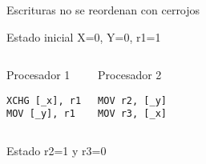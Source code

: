 \begin{frame}[t,fragile]{Escrituras no se reordenan con cerrojos}

\begin{block}{Estado inicial}
X=0, Y=0, r1=1
\end{block}


\begin{columns}[T]


\begin{block}{Procesador 1}
\begin{lstlisting}[language={[x86masm]Assembler}]
XCHG [_x], r1
MOV [_y], r1
\end{lstlisting}
\end{block}

\begin{block}{Procesador 2}
\begin{lstlisting}[language={[x86masm]Assembler}]
MOV r2, [_y]
MOV r3, [_x]
\end{lstlisting}
\end{block}

\end{columns}


\begin{block}{Estado }
r2=1 y r3=0
\end{block}

\end{frame}

